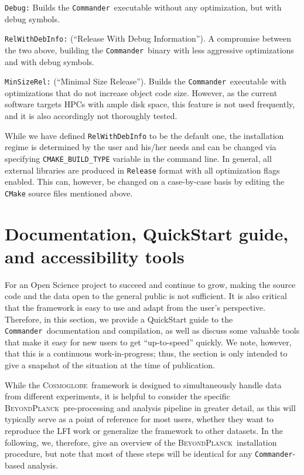 \documentclass[twocolumn]{aa}
\def\commander{\texttt{Commander}}
\newcommand{\BP}{\textsc{BeyondPlanck}}
\newcommand{\cosmoglobe}{\textsc{Cosmoglobe}}
\begin{document}
\texttt{Debug:} Builds the \commander\ executable without any optimization, but with debug symbols.

\texttt{RelWithDebInfo:} (``Release With Debug Information''). A compromise between the two above, building the \commander\ binary with less aggressive optimizations and with debug symbols.

\texttt{MinSizeRel:} (``Minimal Size Release''). Builds the \commander\ executable with optimizations that do not increase object code size. However, as the current software targets HPCs with ample disk space, this feature is not used frequently, and it is also accordingly not thoroughly tested.

While we have defined \texttt{RelWithDebInfo} to be the default one, the installation regime is determined by the user and his/her needs and can be changed via specifying \texttt{CMAKE\_BUILD\_TYPE} variable in the command line. In general, all external libraries are produced in  \texttt{Release} format with all optimization flags enabled. This can, however, be changed on a case-by-case basis by editing the \texttt{CMake}  source files mentioned above.


\section{Documentation, QuickStart guide, and accessibility tools}
\label{sec:bp_reproducibility}

For an Open Science project to succeed and continue to grow, making the source code and the data open to the general public is not sufficient. It is also critical that the framework is easy to use and adapt from the user’s perspective. Therefore, in this section, we provide a QuickStart guide to the \commander\ documentation and compilation, as well as discuss some valuable tools that make it easy for new users to get “up-to-speed” quickly. We note, however, that this is a continuous work-in-progress; thus, the section is only intended to give a snapshot of the situation at the time of publication.

While the \cosmoglobe\ framework is designed to simultaneously handle data from different experiments, it is helpful to consider the specific \BP\ pre-processing and analysis pipeline in greater detail, as this will typically serve as a point of reference for most users, whether they want to reproduce the LFI work or generalize the framework to other datasets. In the following, we, therefore, give an overview of the \BP\ installation procedure, but note that most of these steps will be identical for any \commander-based analysis.
\end{document}
